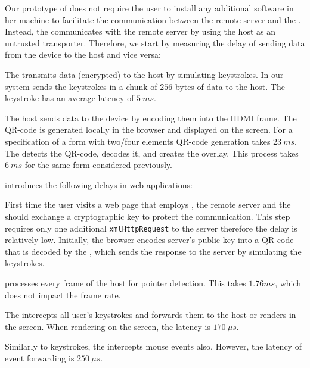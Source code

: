 Our prototype of \name does not require the user to install any additional software in her machine to facilitate the communication between the remote server and the \device. Instead, the \device communicates with the remote server by using the host as an untrusted transporter. Therefore, we start by measuring the delay of sending data from the device to the host and vice versa:

 The \device transmits data (encrypted) to the host by simulating keystrokes. In our system \device sends the keystrokes in a chunk of $256$ bytes of data to the host. The keystroke has an average latency of $5\ ms$.  

 The host sends data to the device by encoding them into the HDMI frame. The QR-code is generated locally in the browser and displayed on the screen. For a specification of a form with two/four elements QR-code generation takes $23\ ms$. The \device detects the QR-code, decodes it, and creates the overlay. This process takes $6\ ms$ for the same form considered previously.
 
\name introduces the following delays in web applications:

 First time the user visits a web page that employs \name, the remote server and the \device should exchange a cryptographic key to protect the communication. This step requires only one additional \texttt{xmlHttpRequest} to the server therefore the delay is relatively low. Initially, the browser encodes server's public key into a QR-code that is decoded by the \device, which sends the response to the server by simulating the keystrokes.

 \device processes every frame of the host for pointer detection. This takes $1.76 ms$, which does not impact the frame rate.

 The \device intercepts all user's keystrokes and forwards them to the host or renders in the screen. When rendering on the screen, the latency is $170\ \mu s$.

 Similarly to keystrokes, the \device intercepts mouse events also. However, the latency of event forwarding is $250\ \mu s$.


